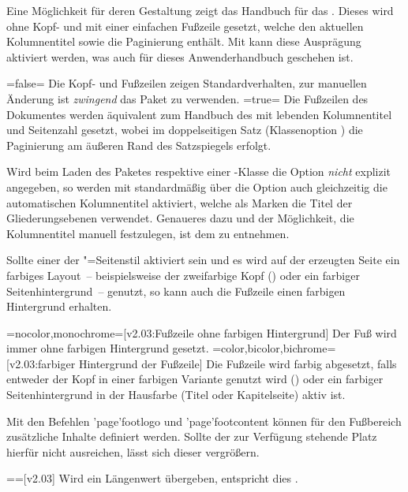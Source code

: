 \begin{DeclareEntity*}{}
\begin{DeclareEntity*}{}
\begin{DeclareEntity*}{}
\begin{Declaration}
Eine Möglichkeit für deren Gestaltung zeigt das Handbuch für das \TUDCD. Dieses 
wird ohne Kopf- und mit einer einfachen Fußzeile gesetzt, welche den aktuellen 
Kolumnentitel sowie die Paginierung enthält. Mit  kann diese 
Ausprägung aktiviert werden, was auch für dieses Anwenderhandbuch geschehen ist.
%
\begin{DeclareValues}
\itemval=false=
  Die Kopf- und Fußzeilen zeigen Standardverhalten, zur manuellen Änderung 
  ist \emph{zwingend} das Paket  zu verwenden.
\itemval*=true=
  Die Fußzeilen des Dokumentes werden äquivalent zum Handbuch des \TUDCDs mit 
  lebenden Kolumnentitel und Seitenzahl gesetzt, wobei im doppelseitigen Satz 
  (Klassenoption ) die Paginierung am äußeren Rand des 
  Satzspiegels erfolgt.
\end{DeclareValues}
%
Wird beim Laden des Paketes  respektive einer 
\TUDScript-Klasse die Option  
\emph{nicht} explizit angegeben, so werden mit  
standardmäßig über die Option  auch 
gleichzeitig die automatischen Kolumnentitel aktiviert, welche als Marken die 
Titel der Gliederungsebenen verwendet. Genaueres dazu und der Möglichkeit, die 
Kolumnentitel manuell festzulegen, ist dem \scrguide zu entnehmen.

Sollte einer der "=Seitenstil aktiviert sein und es wird 
auf der erzeugten Seite ein farbiges Layout~--  beispielsweise der zweifarbige 
Kopf () oder ein farbiger Seitenhintergrund~-- genutzt, 
so kann auch die Fußzeile einen farbigen Hintergrund erhalten.
%
\begin{DeclareValues}
\itemval=nocolor,monochrome=[v2.03:Fußzeile ohne farbigen Hintergrund]
  Der Fuß wird immer ohne farbigen Hintergrund gesetzt.
\itemval=color,bicolor,bichrome=[v2.03:farbiger Hintergrund der Fußzeile]
  Die Fußzeile wird farbig abgesetzt, falls entweder der Kopf in einer farbigen
  Variante genutzt wird () oder ein 
  farbiger Seitenhintergrund in der Hausfarbe (Titel oder Kapitelseite) aktiv 
  ist.
\end{DeclareValues}
%
Mit den Befehlen \Macro'page'{footlogo} und \Macro'page'{footcontent} können 
für den Fußbereich zusätzliche Inhalte definiert werden. Sollte der zur 
Verfügung stehende Platz hierfür nicht ausreichen, lässt sich dieser vergrößern.
%
\begin{DeclareValues}
\itemval=\PLength=[v2.03]
  Wird ein Längenwert übergeben, entspricht dies 
  .
\end{DeclareValues}
\end{Declaration}


\end{DeclareEntity*}
\end{DeclareEntity*}
\end{DeclareEntity*}

